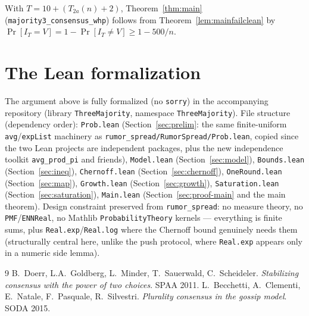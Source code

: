 With $T = 10+(T_{2a}(n)+2)$, Theorem~\ref{thm:main}
(\texttt{majority3\_consensus\_whp}) follows from
Theorem~\ref{lem:mainfailclean} by
$\Pr[I_T=V] = 1-\Pr[I_T\ne V] \ge 1-500/n$.

\section{The Lean formalization}\label{sec:lean}

The argument above is fully formalized (no \texttt{sorry}) in the
accompanying repository (library \texttt{ThreeMajority}, namespace
\texttt{ThreeMajority}). File structure (dependency order):
\texttt{Prob.lean} (Section~\ref{sec:prelim}: the same finite-uniform
\texttt{avg}/\texttt{expList} machinery as
\texttt{rumor\_spread/RumorSpread/Prob.lean}, copied since the two Lean
projects are independent packages, plus the new independence toolkit
\texttt{avg\_prod\_pi} and friends), \texttt{Model.lean}
(Section~\ref{sec:model}), \texttt{Bounds.lean} (Section~\ref{sec:ineq}),
\texttt{Chernoff.lean} (Section~\ref{sec:chernoff}), \texttt{OneRound.lean}
(Section~\ref{sec:map}), \texttt{Growth.lean} (Section~\ref{sec:growth}),
\texttt{Saturation.lean} (Section~\ref{sec:saturation}), \texttt{Main.lean}
(Section~\ref{sec:proof-main} and the main theorem). Design constraint
preserved from \texttt{rumor\_spread}: no measure theory, no
\texttt{PMF}/\texttt{ENNReal}, no Mathlib \texttt{ProbabilityTheory}
kernels --- everything is finite sums, plus \texttt{Real.exp}/\texttt{Real.log}
where the Chernoff bound genuinely needs them (structurally central here,
unlike the push protocol, where \texttt{Real.exp} appears only in a numeric
side lemma).

\begin{thebibliography}{9}
 B.~Doerr, L.A.~Goldberg, L.~Minder, T.~Sauerwald,
C.~Scheideler. \emph{Stabilizing consensus with the power of two choices}.
SPAA 2011.
 L.~Becchetti, A.~Clementi, E.~Natale, F.~Pasquale,
R.~Silvestri. \emph{Plurality consensus in the gossip model}. SODA 2015.
\end{thebibliography}
